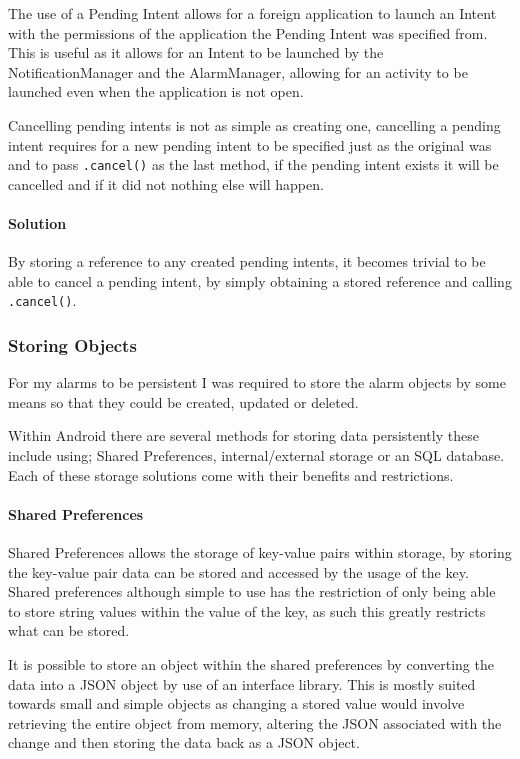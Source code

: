 The use of a Pending Intent allows for a foreign application to launch
an Intent with the permissions of the application the Pending Intent was
specified from. This is useful as it allows for an Intent to be launched
by the NotificationManager and the AlarmManager, allowing for an
activity to be launched even when the application is not open.

Cancelling pending intents is not as simple as creating one, cancelling
a pending intent requires for a new pending intent to be specified just
as the original was and to pass \lstinline!.cancel()! as the last
method, if the pending intent exists it will be cancelled and if it did
not nothing else will happen.

\paragraph{Solution}\label{solution-2}

By storing a reference to any created pending intents, it becomes
trivial to be able to cancel a pending intent, by simply obtaining a
stored reference and calling \lstinline!.cancel()!.

\subsubsection{Storing Objects}\label{storing-objects}

For my alarms to be persistent I was required to store the alarm objects
by some means so that they could be created, updated or deleted.

Within Android there are several methods for storing data persistently
these include using; Shared Preferences, internal/external storage or an
SQL database. Each of these storage solutions come with their benefits
and restrictions.

\paragraph{Shared Preferences}\label{shared-preferences}

Shared Preferences allows the storage of key-value pairs within storage,
by storing the key-value pair data can be stored and accessed by the
usage of the key. Shared preferences although simple to use has the
restriction of only being able to store string values within the value
of the key, as such this greatly restricts what can be stored.

It is possible to store an object within the shared preferences by
converting the data into a JSON object by use of an interface library.
This is mostly suited towards small and simple objects as changing a
stored value would involve retrieving the entire object from memory,
altering the JSON associated with the change and then storing the data
back as a JSON object.

